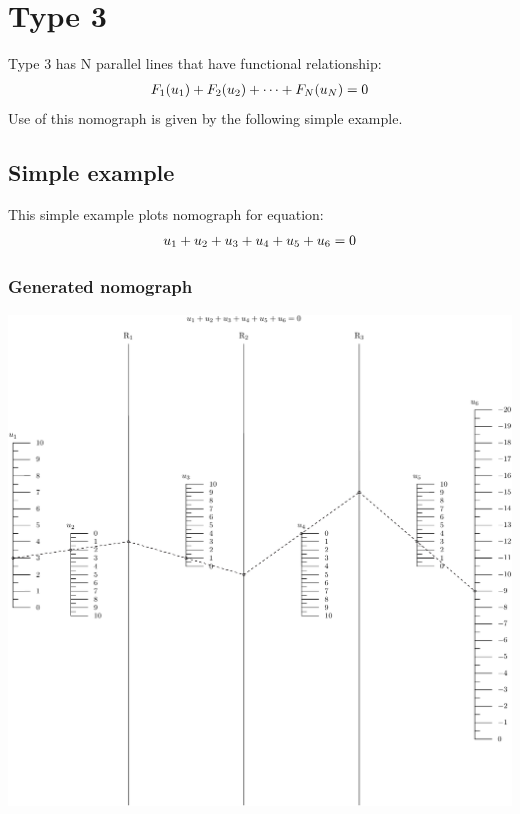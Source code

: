 \documentclass[a4paper,11pt,english]{sphinxmanual}
\begin{document}
\section{Type 3}
\label{types/types:type3-ref}\label{types/types:type-3}
Type 3 has N parallel lines that have functional relationship:
\begin{gather}
\begin{split}F_1(u_1) + F_2(u_2) + \cdots + F_N(u_N) = 0\end{split}\notag
\end{gather}
Use of this nomograph is given by the following
simple example.


\subsection{Simple example}
\label{types/types:id10}
This simple example plots nomograph for equation:
\begin{gather}
\begin{split}u_1 + u_2 + u_3 + u_4 + u_5 + u_6 = 0\end{split}\notag
\end{gather}

\subsubsection{Generated nomograph}
\label{types/types:id11}
\includegraphics{ex_type3_nomo_1.pdf}
\end{document}
